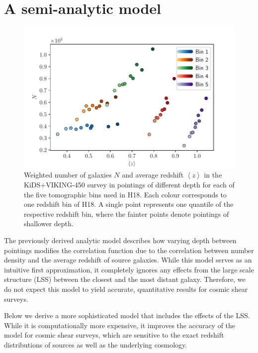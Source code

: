 \documentclass{aa}
\def\la{\left<}
\def\ra{\right>}
\begin{document}
\section{A semi-analytic model}
\label{sec:xipm_semianalytic}
\begin{figure}
\centering
\includegraphics[width=\linewidth]{images/cov_nz_meanz.pdf}
\caption{Weighted number of galaxies $N$ and average redshift $\la z\ra$ in the KiDS+VIKING-450 survey \citep[KV450,][]{Wright:2018} in pointings of different depth for each of the five tomographic bins used in H18. Each colour corresponds to one redshift bin of H18. A single point represents one quantile of the respective redshift bin, where the fainter points denote pointings of shallower depth.}
\label{fig:nz_of_meanz}
\end{figure}
The previously derived analytic model describes how varying depth between pointings modifies the correlation function due to the correlation between number density and the average redshift of source galaxies. While this model serves as an intuitive first approximation, it completely ignores any effects from the large scale structure (LSS) between the closest and the most distant galaxy. Therefore, we do not expect this model to yield accurate, quantitative results for cosmic shear surveys.

Below we derive a more sophisticated model that includes the effects of the LSS. While it is computationally more expensive, it improves the accuracy of the model for cosmic shear surveys, which are sensitive to the exact redshift distributions of sources as well as the underlying cosmology.
\end{document}
